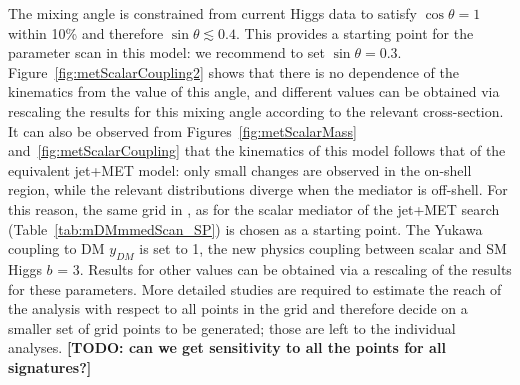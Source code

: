 The mixing angle is constrained from current Higgs data
to satisfy $\cos\theta = 1$ within 10\% and therefore $\sin\theta \lesssim 0.4$. This provides a starting point 
for the parameter scan in this model: we recommend to set $\sin\theta = 0.3$. 
Figure~\ref{fig:metScalarCoupling2} shows that
there is no dependence of the kinematics from the value of this angle, and different values can be obtained via rescaling
the results for this mixing angle according to the relevant cross-section. It can also be observed from Figures~\ref{fig:metScalarMass} and~\ref{fig:metScalarCoupling} 
that the kinematics of this model follows that of the equivalent jet+MET model: only small changes are observed
in the on-shell region, while the relevant distributions diverge when the mediator is off-shell. 
For this reason, the same grid in \mmed, \mdm as for the scalar mediator
of the jet+MET search (Table~\ref{tab:mDMmmedScan_SP}) is chosen as a starting point. 
The Yukawa coupling to DM $y_{DM}$ is set to 1, the 
new physics coupling between scalar and SM Higgs $b$ = 3. Results for other values can be obtained via a 
rescaling of the results for these parameters. 
More detailed studies are required to estimate the reach of the analysis with respect to all points in the grid
and therefore decide on a smaller set of grid points to be generated; 
those are left to the individual analyses. \textbf{[TODO: can we get sensitivity to all the points for all signatures?]}

